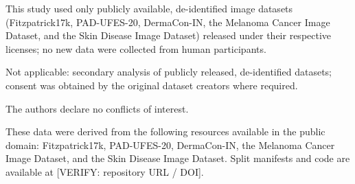 \documentclass[VANCOUVER,twocolumn]{USG}
\begin{document}



This study used only publicly available, de-identified image datasets
(Fitzpatrick17k, PAD-UFES-20, DermaCon-IN, the Melanoma Cancer Image
Dataset, and the Skin Disease Image Dataset) released under their
respective licenses; no new data were collected from human participants.

Not applicable: secondary analysis of publicly released, de-identified
datasets; consent was obtained by the original dataset creators where
required.

The authors declare no conflicts of interest.

These data were derived from the following resources available in the
public domain: Fitzpatrick17k, PAD-UFES-20, DermaCon-IN, the Melanoma
Cancer Image Dataset, and the Skin Disease Image Dataset. Split
manifests and code are available at [VERIFY: repository URL / DOI].


\end{document}
